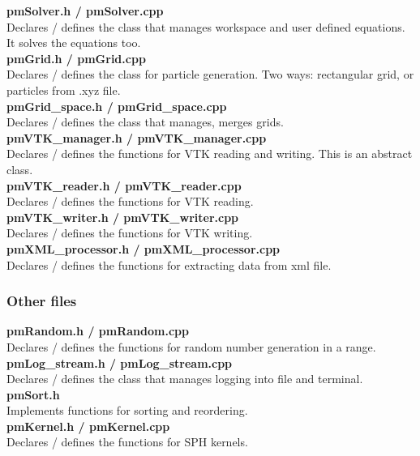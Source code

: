 \documentclass[a4paper,12pt,openany]{book}
\theoremstyle{break}
\begin{document}
\textbf{pmSolver.h / pmSolver.cpp} \\
Declares / defines the class that manages workspace and user defined equations. It solves the equations too. \\

\textbf{pmGrid.h / pmGrid.cpp} \\
Declares / defines the class for particle generation. Two ways: rectangular grid, or particles from .xyz file. \\

\textbf{pmGrid\_space.h / pmGrid\_space.cpp} \\
Declares / defines the class that manages, merges grids. \\

\textbf{pmVTK\_manager.h / pmVTK\_manager.cpp} \\
Declares / defines the functions for VTK reading and writing. This is an abstract class. \\

\textbf{pmVTK\_reader.h / pmVTK\_reader.cpp} \\
Declares / defines the functions for VTK reading. \\

\textbf{pmVTK\_writer.h / pmVTK\_writer.cpp} \\
Declares / defines the functions for VTK writing. \\

\textbf{pmXML\_processor.h / pmXML\_processor.cpp} \\
Declares / defines the functions for extracting data from xml file. \\

\subsubsection{Other files}
\textbf{pmRandom.h / pmRandom.cpp} \\
Declares / defines the functions for random number generation in a range. \\

\textbf{pmLog\_stream.h / pmLog\_stream.cpp} \\
Declares / defines the class that manages logging into file and terminal. \\

\textbf{pmSort.h}\\
Implements functions for sorting and reordering.\\

\textbf{pmKernel.h / pmKernel.cpp} \\
Declares / defines the functions for SPH kernels.\\
\end{document}
